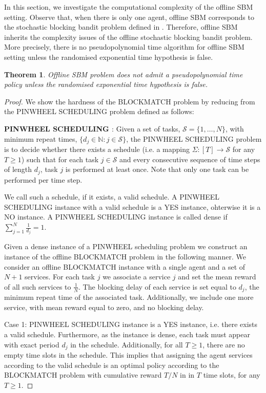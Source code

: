 \documentclass[letterpaper,11pt]{article}
\newtheorem{thm}{Theorem}
\begin{document}
In this section, we investigate the computational complexity of the offline SBM setting. Observe that, when there is only one agent, offline SBM corresponds to the stochastic blocking bandit problem defined in \cite{Basu:2019ui}. Therefore, offline SBM inherits the complexity issues of the offline stochastic blocking bandit problem. More precisely, there is no pseudopolynomial time algorithm for offline SBM setting unless the randomised exponential time hypothesis \cite{exp} is false.
\begin{thm}
     Offline SBM problem does not admit a pseudopolynomial time policy unless the randomised exponential time hypothesis is false.
\end{thm}
\iffalse
\begin{proof}
    We show the hardness of the BLOCKMATCH problem by reducing from the PINWHEEL SCHEDULING problem defined as follows:
    
    \textbf{PINWHEEL SCHEDULING \cite{pinwheel}}: Given a set of tasks, $\mathcal{S} = \{1, \dots, N\}$, with minimum repeat times, $\{d_{j} \in \mathbb{N} : j \in \mathcal{S}\}$, the PINWHEEL SCHEDULING problem is to decide whether there exists a schedule (i.e. a mapping $\Sigma: [T] \to \mathcal{S}$ for any $T \geq 1$) such that for each task $j \in \mathcal{S}$ and every consecutive sequence of time steps of length $d_{j}$, task $j$ is performed at least once. Note that only one task can be performed per time step.
    
    We call such a schedule, if it exists, a valid schedule. A PINWHEEL SCHEDULING instance with a valid schedule is a YES instance, ohterwise it is a NO instance. A PINWHEEL SCHEDULING instance is called dense if $\sum^{N}_{j=1}\frac{1}{d_{j}} = 1$.
    
    Given a dense instance of a PINWHEEL scheduling problem we construct an instance of the offline BLOCKMATCH problem in the following manner. We consider an offline BLOCKMATCH instance with a single agent and a set of $N+1$ services. For each task $j$ we associate a service $j$ and set the mean reward of all such services to $\frac{1}{N}$. The blocking delay of each service is set equal to $d_{j}$, the minimum repeat time of the associated task. Additionally, we include one more service, with mean reward equal to zero, and no blocking delay.
    
    Case 1: PINWHEEL SCHEDULING instance is a YES instance, i.e. there exists a valid schedule. Furthermore, as the instance is dense, each task must appear with exact period $d_{j}$ in the schedule. Additionally, for all $T \geq 1$, there are no empty time slots in the schedule. This implies that assigning the agent services according to the valid schedule is an optimal policy according to the BLOCKMATCH problem with cumulative reward $T / N$ in in $T$ time slots, for any $T \geq 1$.
    

\end{proof}
\end{document}
